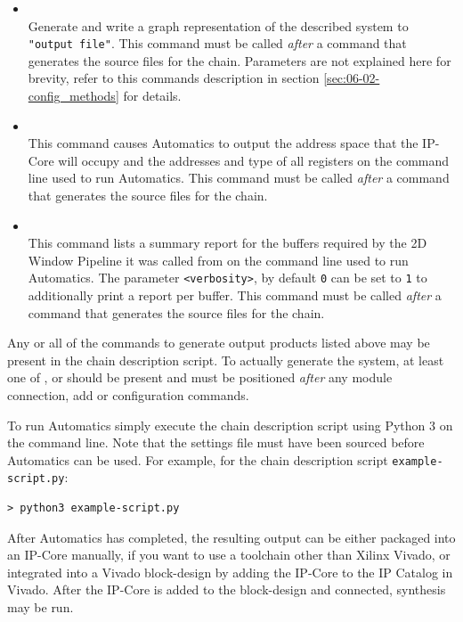 \begin{itemize}
\item {}\\
Generate and write a graph representation of the described system to \texttt{"output file"}.
This command must be called \emph{after} a command that generates the source files for the \asterics chain.
Parameters are not explained here for brevity, refer to this commands description in section \ref{sec:06-02-config_methods} for details.
\item {}\\
This command causes Automatics to output the address space that the \asterics IP-Core will occupy and the addresses and type of all registers on the command line used to run Automatics.
This command must be called \emph{after} a command that generates the source files for the \asterics chain.
\item {}\\
This command lists a summary report for the buffers required by the 2D Window Pipeline it was called from on the command line used to run Automatics.
The parameter \texttt{<verbosity>}, by default \texttt{0} can be set to \texttt{1} to additionally print a report per buffer.
This command must be called \emph{after} a command that generates the source files for the \asterics chain.
\end{itemize}

Any or all of the commands to generate output products listed above may be present in the chain description script.
To actually generate the system, at least one of ,  or  should be present and must be positioned \emph{after} any module connection, add or configuration commands.

To run Automatics simply execute the chain description script using Python 3 on the command line.
Note that the \asterics settings file must have been sourced before Automatics can be used.
For example, for the chain description script \texttt{example-script.py}:
\begin{lstlisting}[style=shell]
 > python3 example-script.py
\end{lstlisting}

After Automatics has completed, the resulting output can be either packaged into an IP-Core manually, if you want to use a toolchain other than Xilinx Vivado, or integrated into a Vivado block-design by adding the IP-Core to the IP Catalog in Vivado.
After the IP-Core is added to the block-design and connected, synthesis may be run.

